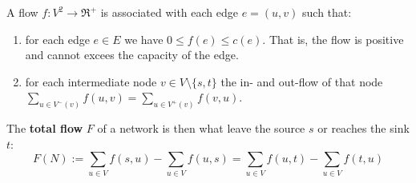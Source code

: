 \begin{definition}[Flow]
	A flow $f : V^2 \longrightarrow \Re^{+}$ is associated with each edge $e = (u,v)$ such that:
	\begin{enumerate}
		\item for each edge $e \in E$ we have $0 \leq f(e) \leq c(e)$. That is, the flow is positive and cannot excees the capacity of the edge.
		
		\item for each intermediate node $v \in V\setminus \{s,t\}$ the in- and out-flow of that node $\sum_{u \in V^-(v)} f(u,v) = \sum_{u \in V^+(v)} f(v,u)$.
	\end{enumerate}
\end{definition}

The \textbf{total flow} $F$ of a network is then what leave the source $s$ or reaches the sink $t$:
\begin{equation}
F(N) := \sum_{u \in V} f(s,u) - \sum_{u \in V}f(u,s) = \sum_{u \in V} f(u,t) - \sum_{u \in V}f(t,u)
\end{equation}

